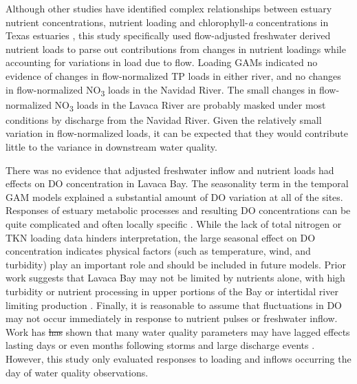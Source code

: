 \documentclass[fleqn,10pt,lineno]{wlpeerj} %
\providecommand{\DIFdeltex}[1]{{\protect\color{red}\sout{#1}}}                      %
\providecommand{\DIFdelbegin}{} %
\providecommand{\DIFdelend}{} %
\providecommand{\DIFdel}[1]{\texorpdfstring{\DIFdeltex{#1}}{}} %
\begin{document}
Although other studies have identified complex relationships between
estuary nutrient concentrations, nutrient loading and
chlorophyll-\emph{a} concentrations in Texas estuaries
\autocite{ornolfsdottirNutrientPulsingRegulator2004,doradoUnderstandingInteractionsFreshwater2015,ciraPhytoplanktonDynamicsLowinflow2021,tominackVariabilityPhytoplanktonBiomass2022},
this study specifically used flow-adjusted freshwater derived nutrient
loads to parse out contributions from changes in nutrient loadings while
accounting for variations in load due to flow. Loading GAMs indicated no
evidence of changes in flow-normalized TP loads in either river, and no
changes in flow-normalized NO\textsubscript{3} loads in the Navidad
River. The small changes in flow-normalized NO\textsubscript{3} loads in
the Lavaca River are probably masked under most conditions by discharge
from the Navidad River. Given the relatively small variation in
flow-normalized loads, it can be expected that they would contribute
little to the variance in downstream water quality.

There was no evidence that adjusted freshwater inflow and nutrient loads
had effects on DO concentration in Lavaca Bay. The seasonality term in
the temporal GAM models explained a substantial amount of DO variation
at all of the sites. Responses of estuary metabolic processes and
resulting DO concentrations can be quite complicated and often locally
specific \autocite{caffreyFactorsControllingNet2004}. While the lack of
total nitrogen or TKN loading data hinders interpretation, the large
seasonal effect on DO concentration indicates physical factors (such as
temperature, wind, and turbidity) play an important role and should be
included in future models. Prior work suggests that Lavaca Bay may not
be limited by nutrients alone, with high turbidity or nutrient
processing in upper portions of the Bay or intertidal river limiting
production \autocite{russell_effect_2006}. Finally, it is reasonable to
assume that fluctuations in DO may not occur immediately in response to
nutrient pulses or freshwater inflow. Work has \DIFdelbegin \DIFdel{has }\DIFdelend shown that many water
quality parameters may have lagged effects lasting days or even months
following storms and large discharge events
\autocite{mooneyWatershedExportEvents2012a,wetzExtremeFutureEstuaries2013,bukaveckasInfluenceStormEvents2020,walkerTimescalesMagnitudeWater2021}.
However, this study only evaluated responses to loading and inflows
occurring the day of water quality observations.
\end{document}
